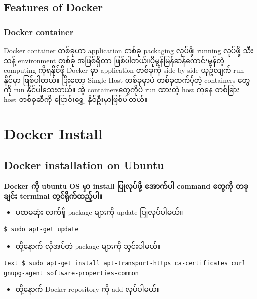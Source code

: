 \documentclass{article}
\begin{document}
\subsection{Features of Docker}\label{features-of-docker}

\subsubsection{Docker container}\label{docker-container}

Docker container တစ်ခုဟာ application တစ်ခု packaging လုပ်ဖို့၊ running
လုပ်ဖို့ သီးသန့် environment တစ်ခု အဖြစ်​ရှိ​တာ
ဖြစ်ပါတယ်။ပိုမွန်​မြန်ဆန်​ကောင်းမွန်တဲ့ computing ကိုရနိုင်ဖို့ Docker
မှာ application တစ်ခုကို side by side ယှဥ်လျက် run နိုင်မှာ ဖြစ်ပါတယ်။
ပြီး​တော့ Single Host တစ်ခုမှာပဲ တစ်ခုထက်ပိုတဲ့ containers ​တွေကို run
နိုင်ပါ​သေးတယ်။ အဲ့ containers ​တွေကိုပဲ run ထားတဲ့ host က္​နေ တစ်ခြား
host တစ်ခုဆီကို ​ပြောင်း​​ရွှေ့ နိုင်ဦးမှာဖြစ်ပါတယ်။

\section{Docker Install}\label{docker-install}

\subsection{Docker installation on
Ubuntu}\label{docker-installation-on-ubuntu}

\textbf{Docker ကို ubuntu OS မှာ install ပြုလုပ်ဖို့ အောက်ပါ command
တွေကို တခုချင်း terminal တွင်ရိုက်ထည့်ပါ။}

\begin{itemize}
\itemsep1pt\parskip0pt
\item
  ပထမဆုံး လက်ရှိ package များကို update ပြုလုပ်ပါမယ်။
\end{itemize}

\begin{verbatim}
$ sudo apt-get update
\end{verbatim}

\begin{itemize}
\itemsep1pt\parskip0pt
\item
  ထို့နောက် လိုအပ်တဲ့ package များကို သွင်းပါမယ်။
\end{itemize}

\texttt{text   \$ sudo apt-get install apt-transport-https ca-certificates curl gnupg-agent software-properties-common}

\begin{itemize}
\itemsep1pt\parskip0pt
\item
  ထို့နောက် Docker repository ကို add လုပ်ပါမယ်။
\end{itemize}
\end{document}

